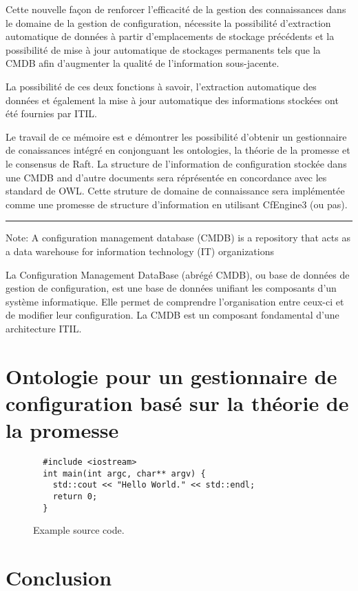 Cette nouvelle façon de renforcer l'efficacité de la gestion des connaissances
dans le domaine de la gestion de configuration, nécessite la possibilité
d'extraction automatique de données à partir d'emplacements de stockage
précédents et la possibilité de mise à jour automatique de stockages permanents
tels que la CMDB afin d'augmenter la qualité de l'information sous-jacente.

La possibilité de ces deux fonctions à savoir, l'extraction automatique des
données et également la mise à jour automatique des informations stockées ont
été fournies par ITIL.

Le travail de ce mémoire est e démontrer les possibilité d'obtenir un
gestionnaire de conaissances intégré en conjonguant les ontologies, la théorie
de la promesse et le consensus de Raft. La structure de l'information de
configuration stockée dans une CMDB and d'autre documents sera réprésentée en
concordance avec les standard de OWL. Cette struture de domaine de connaissance
sera implémentée comme une promesse de structure d'information en utilisant
CfEngine3 (ou pas).

\noindent\rule{8cm}{0.4pt}

Note: A configuration management database (CMDB) is a repository that acts as a
data warehouse for information technology (IT) organizations

La Configuration Management DataBase (abrégé CMDB), ou base de données de
gestion de configuration, est une base de données unifiant les composants d'un
système informatique. Elle permet de comprendre l'organisation entre ceux-ci et
de modifier leur configuration. La CMDB est un composant fondamental d'une
architecture ITIL.

\section{Ontologie pour un gestionnaire de configuration basé sur la théorie de
la promesse}


\begin{figure}
  \begin{verbatim}
  #include <iostream>
  int main(int argc, char** argv) {
    std::cout << "Hello World." << std::endl;
    return 0;
  }
  \end{verbatim}
  \caption{Example source code.}
  \label{fig:sourcecode}
\end{figure}

\section{Conclusion}

